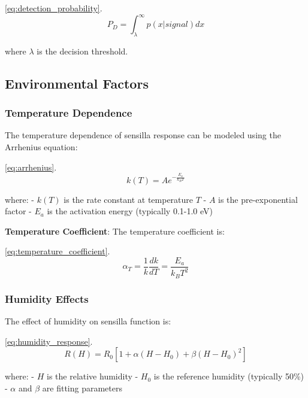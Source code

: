 \documentclass[
  13pt,
  a4paperpaper,
  12pt]{article}
\begin{document}
\eqref{eq:detection_probability}. \begin{equation}
P_D = \int_{\lambda}^{\infty} p(x|signal) dx \label{eq:detection_probability}
\end{equation}

where \(\lambda\) is the decision threshold.

\subsection{Environmental Factors}\label{environmental-factors}

\subsubsection{Temperature Dependence}\label{temperature-dependence}

The temperature dependence of sensilla response can be modeled using the
Arrhenius equation:

\eqref{eq:arrhenius}. \begin{equation}
k(T) = A e^{-\frac{E_a}{k_B T}} \label{eq:arrhenius}
\end{equation}

where: - \(k(T)\) is the rate constant at temperature \(T\) - \(A\) is
the pre-exponential factor - \(E_a\) is the activation energy (typically
0.1-1.0 eV)

\textbf{Temperature Coefficient}: The temperature coefficient is:

\eqref{eq:temperature_coefficient}. \begin{equation}
\alpha_T = \frac{1}{k} \frac{dk}{dT} = \frac{E_a}{k_B T^2} \label{eq:temperature_coefficient}
\end{equation}

\subsubsection{Humidity Effects}\label{humidity-effects}

The effect of humidity on sensilla function is:

\eqref{eq:humidity_response}. \begin{equation}
R(H) = R_0 \left[1 + \alpha(H - H_0) + \beta(H - H_0)^2\right] \label{eq:humidity_response}
\end{equation}

where: - \(H\) is the relative humidity - \(H_0\) is the reference
humidity (typically 50\%) - \(\alpha\) and \(\beta\) are fitting
parameters
\end{document}

